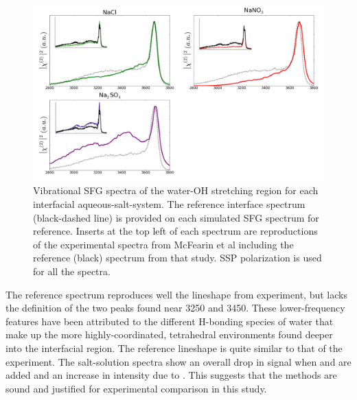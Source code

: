\begin{figure}[h!]
\begin{center}
	\includegraphics[scale=1.0]{images/sfg-spectra.png}
	\caption{Vibrational SFG spectra of the water-OH stretching region for each interfacial aqueous-salt-\ctc system. The reference \ctcwat interface spectrum (black-dashed line) is provided on each simulated SFG spectrum for reference. Inserts at the top left of each spectrum are reproductions of the experimental spectra from McFearin et al\cite{McFearin2009} including the reference (black) spectrum from that study. SSP polarization is used for all the spectra.}
	\label{fig:sfg-spectra}
\end{center}
\end{figure}


The reference \ctcwat spectrum reproduces well the lineshape from experiment, but lacks the definition of the two peaks found near 3250 and 3450\cm. These lower-frequency features have been attributed to the different H-bonding species of water that make up the more highly-coordinated, tetrahedral environments found deeper into the interfacial region. The reference \ctcwat lineshape is quite similar to that of the experiment. The salt-solution spectra show an overall drop in signal when \cl and \nit are added and an increase in intensity due to \sul. This suggests that the methods are sound and justified for experimental comparison in this study.

